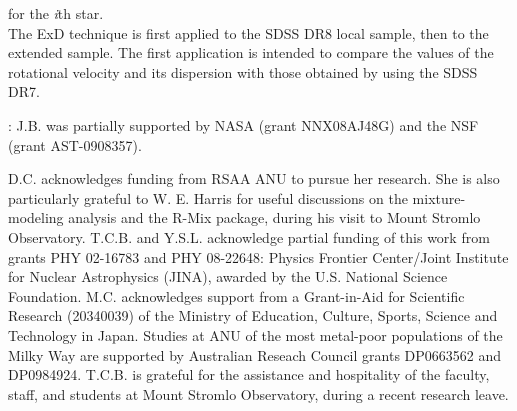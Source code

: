 \documentclass[apj]{emulateapj}
\begin{document}
for the \emph{i}th star.\\

The ExD technique is first applied to the SDSS DR8 local sample, then
to the extended sample. The first application is intended to compare
the values of the rotational velocity and its dispersion with those
obtained by using the SDSS DR7.






: J.B. was partially supported by
NASA (grant NNX08AJ48G) and the NSF (grant AST-0908357).

D.C. acknowledges funding from RSAA ANU to pursue her research. She is also
particularly grateful to W. E. Harris for useful discussions on the
mixture-modeling analysis and the R-Mix package, during his visit to Mount Stromlo
Observatory. T.C.B. and Y.S.L. acknowledge partial funding of this work from
grants PHY 02-16783 and PHY 08-22648: Physics Frontier Center/Joint Institute
for Nuclear Astrophysics (JINA), awarded by the U.S. National Science
Foundation. M.C. acknowledges support from a Grant-in-Aid for Scientific
Research (20340039) of the Ministry of Education, Culture, Sports, Science and
Technology in Japan. Studies at ANU of the most metal-poor populations of the
Milky Way are supported by Australian Reseach Council grants DP0663562 and
DP0984924. T.C.B. is grateful for the assistance and hospitality of the faculty,
staff, and students at Mount Stromlo Observatory, during a recent research leave.

\end{document}
